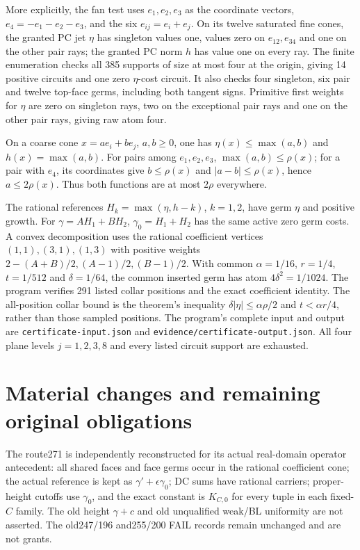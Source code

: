 \documentclass[11pt]{article}
\begin{document}
More explicitly, the fan test uses $e_1,e_2,e_3$ as the coordinate
vectors, $e_4=-e_1-e_2-e_3$, and the six $e_{ij}=e_i+e_j$.
On its twelve saturated fine cones, the granted PC jet $\eta$
has singleton values one, values zero on $e_{12},e_{34}$ and
one on the other pair rays; the granted PC norm $h$ has value
one on every ray. The finite enumeration checks all 385
supports of size at most four at the origin, giving 14 positive
circuits and one zero $\eta$-cost circuit. It also checks four
singleton, six pair and twelve top-face germs, including both
tangent signs. Primitive first weights for $\eta$ are zero on
singleton rays, two on the exceptional pair rays and one on
the other pair rays, giving raw atom four.

On a coarse cone $x=ae_i+be_j$, $a,b\geq0$, one has
$\eta(x)\leq\max(a,b)$ and $h(x)=\max(a,b)$. For pairs
among $e_1,e_2,e_3$, $\max(a,b)\leq\rho(x)$; for a pair
with $e_4$, its coordinates give $b\leq\rho(x)$ and
$|a-b|\leq\rho(x)$, hence $a\leq2\rho(x)$.
Thus both functions are at most $2\rho$ everywhere.

The rational references $H_k=\max(\eta,h-k)$, $k=1,2$, have
germ $\eta$ and positive growth. For
$\gamma=A H_1+B H_2$, $\gamma_0=H_1+H_2$ has the same active
zero germ costs. A convex decomposition uses the rational
coefficient vertices $(1,1),(3,1),(1,3)$ with positive weights
$2-(A+B)/2,(A-1)/2,(B-1)/2$. With common
$\alpha=1/16$, $r=1/4$, $t=1/512$ and $\delta=1/64$,
the common inserted germ has atom $4\delta^2=1/1024$.
The program verifies 291 listed collar positions and the exact
coefficient identity. The all-position collar bound is the
theorem's inequality $\delta|\eta|\leq\alpha\rho/2$ and
$t<\alpha r/4$, rather than those sampled positions. The
program's complete input and output are
\texttt{certificate-input.json} and
\texttt{evidence/certificate-output.json}. All four plane levels
$j=1,2,3,8$ and every listed circuit support are exhausted.

\section{Material changes and remaining original obligations}
The route271 is independently reconstructed for its actual
real-domain operator antecedent: all shared faces and face germs
occur in the rational coefficient cone; the actual reference is
kept as $\gamma'+\epsilon\gamma_0$; DC sums have rational
carriers; proper-height cutoffs use $\gamma_0$, and the exact
constant is $K_{C,0}$ for every tuple in each fixed-$C$ family.
The old height $\gamma+c$ and old unqualified weak/BL uniformity
are not asserted. The old247/196 and255/200 FAIL records remain
unchanged and are not grants.
\end{document}
